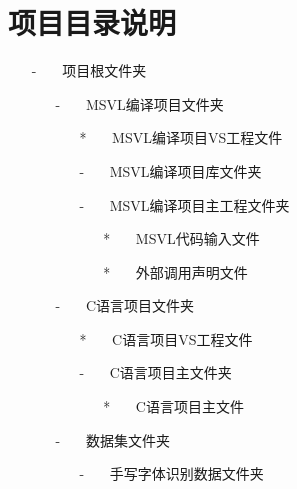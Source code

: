 \documentclass[UTF-8]{progbookcn}
\begin{document}
\section{项目目录说明}
\begin{itemize}
      \item[-]  ~~~项目根文件夹
          \begin{itemize}
            \item[-] ~~~MSVL编译项目文件夹
            \begin{itemize}
              \item[*]  ~~~MSVL编译项目VS工程文件
              \item[-]  ~~~MSVL编译项目库文件夹
              \item[-]  ~~~MSVL编译项目主工程文件夹
              \begin{itemize}
                \item[*]  ~~~MSVL代码输入文件
                \item[*]  ~~~外部调用声明文件
              \end{itemize}
            \end{itemize}
            \item[-] ~~~C语言项目文件夹
            \begin{itemize}
              \item[*]  ~~~C语言项目VS工程文件
              \item[-]  ~~~C语言项目主文件夹
              \begin{itemize}
                \item[*] ~~~C语言项目主文件
              \end{itemize}
            \end{itemize}
            \item[-] ~~~数据集文件夹
                \begin{itemize}
                  \item[-]  ~~~手写字体识别数据文件夹
                \end{itemize}
          \end{itemize}
\end{itemize}
\end{document}
